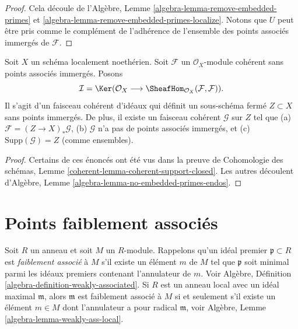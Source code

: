 \begin{proof}
Cela découle de l’Algèbre, Lemme  \ref{algebra-lemma-remove-embedded-primes}  et  \ref{algebra-lemma-remove-embedded-primes-localize}. Notons que
 $U$  peut être pris comme le complément de l’adhérence de l’ensemble des
points associés immergés de  $\mathcal{F}$.
\end{proof}

\begin{lemma}
\label{lemma-no-embedded-points-endos}
Soit  $X$  un schéma localement noethérien. Soit  $\mathcal{F}$  un
 $\mathcal{O}_X$-module cohérent sans points associés immergés. Posons
$$
\mathcal{I}
=
\Ker(\mathcal{O}_X
\longrightarrow
\SheafHom_{\mathcal{O}_X}(\mathcal{F}, \mathcal{F})).
$$
Il s’agit d’un faisceau cohérent d’idéaux qui définit un sous-schéma fermé
 $Z \subset X$  sans points immergés. De plus, il existe un faisceau cohérent
 $\mathcal{G}$  sur  $Z$  tel que (a)  $\mathcal{F} = (Z \to X)_*\mathcal{G}$, (b)  $\mathcal{G}$  n’a pas
de points associés immergés, et (c)  $\text{Supp}(\mathcal{G}) = Z$  (comme ensembles).
\end{lemma}

\begin{proof}
Certains de ces énoncés ont été vus dans la preuve de Cohomologie des
schémas, Lemme  \ref{coherent-lemma-coherent-support-closed}. Les autres découlent d'Algèbre, Lemme  \ref{algebra-lemma-no-embedded-primes-endos}.
\end{proof}



\section{Points faiblement associés}
\label{section-weakly-associated}

\noindent
Soit  $R$  un anneau et soit  $M$  un  $R$-module. Rappelons
qu'un idéal premier  $\mathfrak p \subset R$  est  {\it  faiblement
associé}  à  $M$  s'il existe un élément  $m$  de
 $M$  tel que  $\mathfrak p$  soit minimal parmi les idéaux premiers contenant
l'annulateur de  $m$. Voir Algèbre, Définition  \ref{algebra-definition-weakly-associated}. Si
 $R$  est un anneau local avec un idéal maximal  $\mathfrak m$, alors
 $\mathfrak m$  est faiblement associé à  $M$  si et seulement s'il existe un
élément  $m \in M$  dont l'annulateur a pour radical  $\mathfrak m$, voir Algèbre,
Lemme  \ref{algebra-lemma-weakly-ass-local}.


